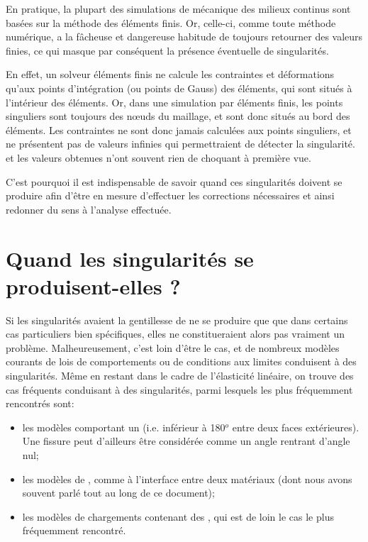 \medskip
En pratique, la plupart des simulations de mécanique des milieux continus sont basées sur la
méthode des éléments finis. Or, celle-ci, comme toute méthode numérique, a la fâcheuse
et dangereuse habitude de toujours retourner des valeurs finies, ce qui masque par conséquent la présence
éventuelle de singularités.

\medskip
En effet, un solveur éléments finis ne calcule les contraintes et déformations qu'aux points
d'intégration (ou points de Gauss) des éléments, qui sont situés à l'intérieur des éléments.
Or, dans une simulation par éléments finis, les points singuliers sont toujours des nœuds du
maillage, et sont donc situés au bord des éléments. Les contraintes ne sont donc jamais
calculées aux points singuliers, et ne présentent pas de valeurs infinies qui permettraient de
détecter la singularité.  et les valeurs obtenues n'ont souvent rien de choquant à première
vue.

C'est pourquoi il est indispensable de savoir  quand ces singularités doivent se produire
afin d'être en mesure d'effectuer les corrections nécessaires et ainsi redonner du
sens à l'analyse effectuée.


\medskip
\section{Quand les singularités se produisent-elles ?}

Si les singularités avaient la gentillesse de ne se produire que que dans certains cas particuliers
bien spécifiques, elles ne constitueraient alors pas vraiment un problème.
Malheureusement, c'est loin d'être le cas, et de nombreux modèles courants de
lois de comportements ou de conditions aux limites conduisent à des singularités.
Même en restant dans le cadre de l'élasticité linéaire, on trouve des cas fréquents
conduisant à des singularités, parmi lesquels les plus fréquemment rencontrés sont:
\medskip
\begin{itemize}
   \item les modèles comportant un  (i.e. inférieur à
	180$^o$ entre deux faces extérieures). Une fissure peut d'ailleurs être considérée
	comme un angle rentrant d'angle nul;

   \item les modèles de , comme à
	l'interface entre deux matériaux (dont nous avons souvent parlé tout au long de ce
	document);
   \item les modèles de chargements contenant des , qui est
	de loin le cas le plus fréquemment rencontré.
\end{itemize}

